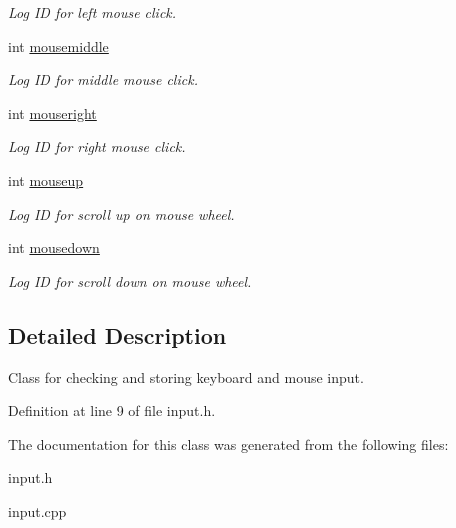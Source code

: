 \begin{DoxyCompactItemize}
\begin{DoxyCompactList}\small\item\em Log ID for left mouse click. \end{DoxyCompactList}\item 
int \hyperlink{classInput_aeada901dbf556cb13f81d8326943dd08}{mousemiddle}\hypertarget{classInput_aeada901dbf556cb13f81d8326943dd08}{}\label{classInput_aeada901dbf556cb13f81d8326943dd08}

\begin{DoxyCompactList}\small\item\em Log ID for middle mouse click. \end{DoxyCompactList}\item 
int \hyperlink{classInput_abbf0471b00d750ae25d638bca74be28f}{mouseright}\hypertarget{classInput_abbf0471b00d750ae25d638bca74be28f}{}\label{classInput_abbf0471b00d750ae25d638bca74be28f}

\begin{DoxyCompactList}\small\item\em Log ID for right mouse click. \end{DoxyCompactList}\item 
int \hyperlink{classInput_a66df7023e5db7300d0f9bcdafd140bf5}{mouseup}\hypertarget{classInput_a66df7023e5db7300d0f9bcdafd140bf5}{}\label{classInput_a66df7023e5db7300d0f9bcdafd140bf5}

\begin{DoxyCompactList}\small\item\em Log ID for scroll up on mouse wheel. \end{DoxyCompactList}\item 
int \hyperlink{classInput_a254eb8e3616257909a23449a7b87175e}{mousedown}\hypertarget{classInput_a254eb8e3616257909a23449a7b87175e}{}\label{classInput_a254eb8e3616257909a23449a7b87175e}

\begin{DoxyCompactList}\small\item\em Log ID for scroll down on mouse wheel. \end{DoxyCompactList}\end{DoxyCompactItemize}


\subsection{Detailed Description}
Class for checking and storing keyboard and mouse input. 

Definition at line 9 of file input.\+h.



The documentation for this class was generated from the following files\+:\begin{DoxyCompactItemize}
\item 
input.\+h\item 
input.\+cpp\end{DoxyCompactItemize}
